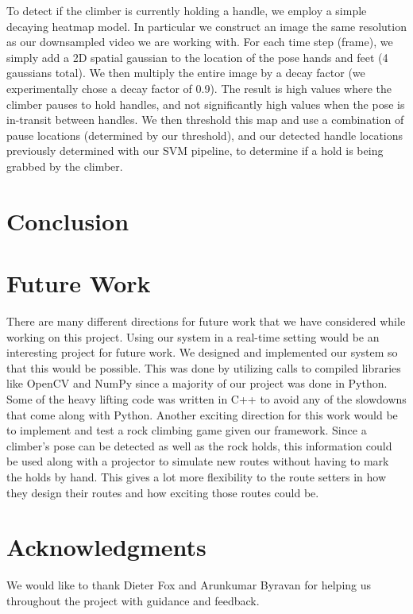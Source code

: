 \documentclass{chi2009}
\begin{document}
To detect if the climber is currently holding a handle, we employ a simple decaying heatmap model. In particular we construct an image the same resolution as our downsampled video we are working with. For each time step (frame), we simply add a 2D spatial gaussian to the location of the pose hands and feet (4 gaussians total). We then multiply the entire image by a decay factor (we experimentally chose a decay factor of 0.9). The result is high values where the climber pauses to hold handles, and not significantly high values when the pose is in-transit between handles. We then threshold this map and use a combination of pause locations (determined by our threshold), and our detected handle locations previously determined with our SVM pipeline, to determine if a hold is being grabbed by the climber.

\section{Conclusion}


\section{Future Work}

There are many different directions for future work that we have considered while working on this project. Using our system in a real-time setting would be an interesting project for future work. We designed and implemented our system so that this would be possible. This was done by utilizing calls to compiled libraries like OpenCV and NumPy since a majority of our project was done in Python. Some of the heavy lifting code was written in C++ to avoid any of the slowdowns that come along with Python. Another exciting direction for this work would be to implement and test a rock climbing game given our framework. Since a climber's pose can be detected as well as the rock holds, this information could be used along with a projector to simulate new routes without having to mark the holds by hand. This gives a lot more flexibility to the route setters in how they design their routes and how exciting those routes could be.

\section{Acknowledgments}

We would like to thank Dieter Fox and Arunkumar Byravan for helping us throughout the project with guidance and feedback.



\end{document}
